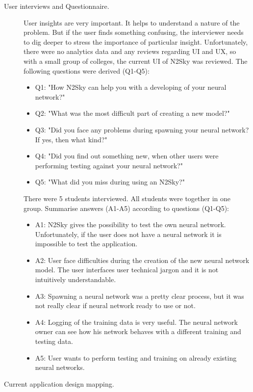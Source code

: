 \begin{description}
\item[User interviews and Questionnaire.]
User insights are very important. It helps to understand a nature of the problem. But if the user finds something confusing, the interviewer needs to dig deeper to stress the importance of particular insight. Unfortunately, there were no analytics data and any reviews regarding UI and UX, so with a small group of colleges, the current UI of N2Sky was reviewed. 
The following questions were derived (Q1-Q5): 


\begin{itemize}
\item Q1: "How N2Sky can help you with a developing of your neural network?"
\item Q2: "What was the most difficult part of creating a new model?"
\item Q3: "Did you face any problems during spawning your neural network? If yes, then what kind?"
\item Q4: "Did you find out something new, when other users were performing testing against your neural network?"
\item Q5: "What did you miss during using an N2Sky?"
\end{itemize}    

There were 5 students interviewed. All students were together in one group. Summarise answers (A1-A5) according to questions (Q1-Q5): 

\begin{itemize}
\item A1: N2Sky gives the possibility to test the own neural network. Unfortunately, if the user does not have a neural network it is impossible to test the application.   
\item A2:  User face difficulties during the creation of the new neural network model. The user interfaces user technical jargon and it is not intuitively understandable.  
\item A3:  Spawning a neural network was a pretty clear process, but it was not really clear if neural network ready to use or not.
\item A4:  Logging of the training data is very useful. The neural network owner can see how his network behaves with a different training and testing data.
\item A5:  User wants to perform testing and training on already existing neural networks. 
\end{itemize}    


\item[Current application design mapping.]


\end{description}
